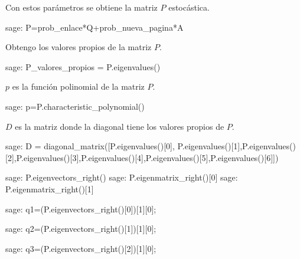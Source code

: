 \par Con estos parámetros se obtiene la matriz $P$ estocástica.
\begin{sagecommandline}
    sage: P=prob_enlace*Q+prob_nueva_pagina*A
\end{sagecommandline}

\par Obtengo los valores propios de la matriz $P$.
\begin{sagecommandline}
    sage: P_valores_propios = P.eigenvalues()
\end{sagecommandline}
\par $p$ es la función polinomial de la matriz $P$.
\begin{sagecommandline}
    sage: p=P.characteristic_polynomial()
\end{sagecommandline}
\par $D$ es la matriz donde la diagonal tiene los valores propios de $P$.
\begin{sagecommandline}
    sage: D = diagonal_matrix([P.eigenvalues()[0], P.eigenvalues()[1],P.eigenvalues()[2],P.eigenvalues()[3],P.eigenvalues()[4],P.eigenvalues()[5],P.eigenvalues()[6]])
\end{sagecommandline}



\begin{sagecommandline}[\textwidth]
    sage: P.eigenvectors_right()
    sage: P.eigenmatrix_right()[0]
    sage: P.eigenmatrix_right()[1]
\end{sagecommandline}
    
\begin{sagecommandline}
    sage: q1=(P.eigenvectors_right()[0])[1][0];
\end{sagecommandline}

\begin{sagecommandline}
    sage: q2=(P.eigenvectors_right()[1])[1][0];
\end{sagecommandline}

\begin{sagecommandline}
    sage: q3=(P.eigenvectors_right()[2])[1][0];
\end{sagecommandline}


